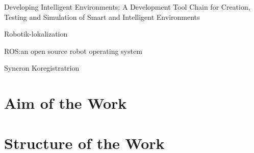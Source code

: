 Developing Intelligent Environments: A Development Tool Chain for Creation, Testing and Simulation of Smart and Intelligent Environments\cite{roalter2011developing}

Robotik-lokalization\cite{MooreStouchKeneralizedEkf2014}

ROS:\@ an open source robot operating system\cite{Quigley2009ROSAO}

Syncron Koregistratrion\cite{Frank2019SyncKoreg}

\section{Aim of the Work}\label{sec:aimOfTheWork}
\section{Structure of the Work}\label{sec:structure}

